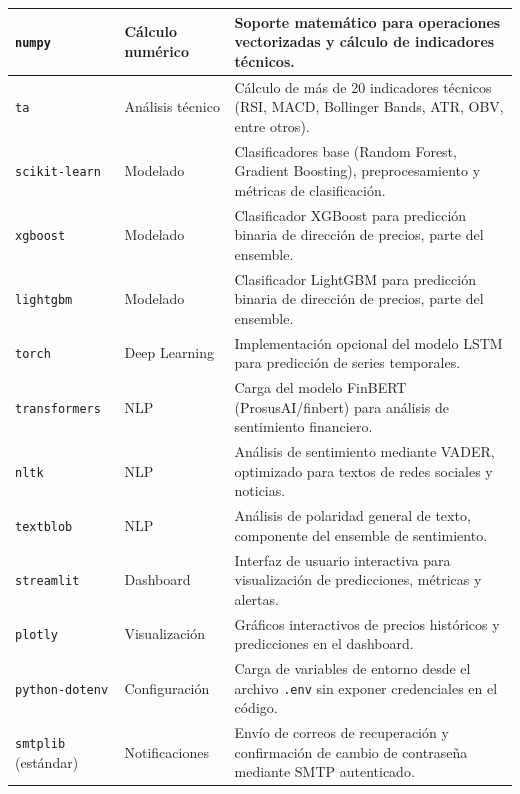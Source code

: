 \begin{longtable}{p{2.5cm} p{2.3cm} p{6.5cm}}
  \texttt{numpy} & Cálculo numérico &
  Soporte matemático para operaciones vectorizadas y cálculo de indicadores técnicos. \\      
  \midrule

  \texttt{ta} & Análisis técnico &
  Cálculo de más de 20 indicadores técnicos (RSI, MACD, Bollinger Bands, ATR, OBV, entre      
  otros). \\
  \midrule

  \texttt{scikit-learn} & Modelado &
  Clasificadores base (Random Forest, Gradient Boosting), preprocesamiento y métricas de      
  clasificación. \\
  \midrule

  \texttt{xgboost} & Modelado &
  Clasificador XGBoost para predicción binaria de dirección de precios, parte del ensemble. \\  \midrule

  \texttt{lightgbm} & Modelado &
  Clasificador LightGBM para predicción binaria de dirección de precios, parte del ensemble.  
  \\
  \midrule

  \texttt{torch} & Deep Learning &
  Implementación opcional del modelo LSTM para predicción de series temporales. \\
  \midrule

  \texttt{transformers} & NLP &
  Carga del modelo FinBERT (ProsusAI/finbert) para análisis de sentimiento financiero. \\     
  \midrule

  \texttt{nltk} & NLP &
  Análisis de sentimiento mediante VADER, optimizado para textos de redes sociales y noticias.   \\
  \midrule

  \texttt{textblob} & NLP &
  Análisis de polaridad general de texto, componente del ensemble de sentimiento. \\
  \midrule

  \texttt{streamlit} & Dashboard &
  Interfaz de usuario interactiva para visualización de predicciones, métricas y alertas. \\  
  \midrule

  \texttt{plotly} & Visualización &
  Gráficos interactivos de precios históricos y predicciones en el dashboard. \\
  \midrule

  \texttt{python-dotenv} & Configuración &
  Carga de variables de entorno desde el archivo \texttt{.env} sin exponer credenciales en el 
  código. \\
  \midrule

  \texttt{smtplib} (estándar) & Notificaciones &
  Envío de correos de recuperación y confirmación de cambio de contraseña mediante SMTP       
  autenticado. \\

  \end{longtable}


